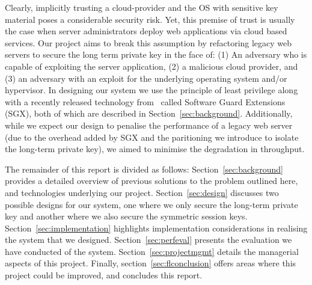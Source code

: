 \documentclass[../main.tex]{subfiles}
\begin{document}
Clearly, implicitly trusting a cloud-provider and the OS with
sensitive key material poses a considerable security risk. Yet, this
premise of trust is usually the case when server administrators deploy
web applications via cloud based services. Our project aims to break
this assumption by refactoring legacy web servers to secure the long
term private key in the face of: (1) An adversary who is capable of
exploiting the server application, (2) a malicious cloud provider, and
(3) an adversary with an exploit for the underlying operating system
and/or hypervisor. In designing our system we use the principle of
least privilege along with a recently released technology from
\Intel~called Software Guard Extensions (SGX), both of which are
described in Section~\ref{sec:background}. Additionally, while we
expect our design to penalise the performance of a legacy web server
(due to the overhead added by SGX and the paritioning we introduce to
isolate the long-term private key), we aimed to minimise the
degradation in throughput.

The remainder of this report is divided as follows:
Section~\ref{sec:background} provides a detailed overview of previous
solutions to the problem outlined here, and technologies underlying
our project. Section~\ref{sec:design} discusses two possible designs
for our system, one where we only secure the long-term private key and
another where we also secure the symmetric session keys.
Section~\ref{sec:implementation} highlights implementation
considerations in realising the system that we designed.
Section~\ref{sec:perfeval} presents the evaluation we have conducted
of the system. Section~\ref{sec:projectmgmt} details the managerial
aspects of this project. Finally, section~\ref{sec:flconclusion}
offers areas where this project could be improved, and concludes this
report.
	
\end{document}

